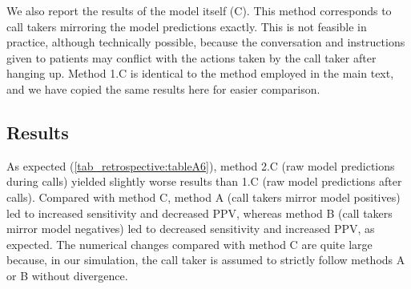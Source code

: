 {We also report the results of the model itself (C). This method corresponds to call takers mirroring the model predictions exactly. This is not feasible in practice, although technically possible, because the conversation and instructions given to patients may conflict with the actions taken by the call taker after hanging up. Method 1.C is identical to the method employed in the main text, and we have copied the same results here for easier comparison.


\subsection{Results}

As expected (\cref{tab_retrospective:tableA6}), method 2.C (raw model predictions during calls) yielded slightly worse results than 1.C (raw model predictions after calls). Compared with method C, method A (call takers mirror model positives) led to increased sensitivity and decreased PPV, whereas method B (call takers mirror model negatives) led to decreased sensitivity and increased PPV, as expected. The numerical changes compared with method C are quite large because, in our simulation, the call taker is assumed to strictly follow methods A or B without divergence.

\begin{table}[h]
    \centering
    \caption{Overall performance of model, call takers and simulated combinations of model and call takers on MH-1813 test data.}
    \label{tab_retrospective:tableA6}
\end{table}}
